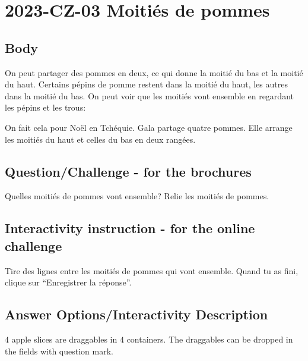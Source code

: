 \documentclass[a4paper,11pt]{report}
\newcommand{\taskGraphicsFolder}{..}
\begin{document}
\section*{\centering{} 2023-CZ-03 Moitiés de pommes}


\subsection*{Body}

On peut partager des pommes en deux, ce qui donne la moitié du bas et la moitié du haut. Certains pépins de pomme restent dans la moitié du haut, les autres dans la moitié du bas. On peut voir que les moitiés vont ensemble en regardant les pépins et les trous:

{\centering%
\par}

On fait cela pour Noël en Tchéquie. Gala partage quatre pommes. Elle arrange les moitiés du haut et celles du bas en deux rangées.

{\em


\subsection*{Question/Challenge - for the brochures}

Quelles moitiés de pommes vont ensemble? Relie les moitiés de pommes.

{\centering%
\par}

}


\subsection*{Interactivity instruction - for the online challenge}

Tire des lignes entre les moitiés de pommes qui vont ensemble. Quand tu as fini, clique sur “Enregistrer la réponse”.

\begingroup
\renewcommand{\arraystretch}{1.5}
\subsection*{Answer Options/Interactivity Description}

$4$ apple slices are draggables in $4$ containers. The draggables can be dropped in the fields with question mark.
\end{document}
